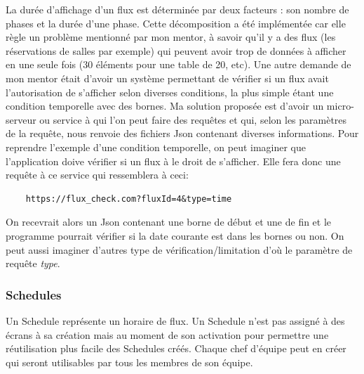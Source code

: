 \documentclass[french]{article}
\begin{document}
La durée d'affichage d'un flux est déterminée par deux facteurs : son nombre de phases et la durée d'une phase. Cette décomposition a été implémentée car elle règle un problème mentionné par mon mentor, à savoir qu'il y a des flux (les réservations de salles par exemple) qui peuvent avoir trop de données à afficher en une seule fois (30 éléments pour une table de 20, etc). \newline
Une autre demande de mon mentor était d'avoir un système permettant de vérifier si un flux avait l'autorisation de s'afficher selon diverses conditions, la plus simple étant une condition temporelle avec des bornes. Ma solution proposée est d'avoir un micro-serveur ou service à qui l'on peut faire des requêtes et qui, selon les paramètres de la requête, nous renvoie des fichiers Json contenant diverses informations. Pour reprendre l'exemple d'une condition temporelle, on peut imaginer que l'application doive vérifier si un flux à le droit de s'afficher. Elle fera donc une requête à ce service qui ressemblera à ceci: 
\begin{verbatim}
	https://flux_check.com?fluxId=4&type=time
\end{verbatim}
On recevrait alors un Json contenant une borne de début et une de fin et le programme pourrait vérifier si la date courante est dans les bornes ou non. On peut aussi imaginer d'autres type de vérification/limitation d'où le paramètre de requête \textit{type}.

\subsubsection{Schedules}
Un Schedule représente un horaire de flux. Un Schedule n'est pas assigné à des écrans à sa création mais au moment de son activation pour permettre  une réutilisation plus facile des Schedules créés. Chaque chef d'équipe peut en créer qui seront utilisables par tous les membres de son équipe. \newline
\end{document}
